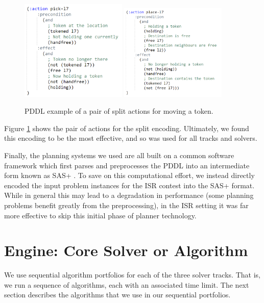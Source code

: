 \documentclass{article}
\renewcommand{\cite}[1]{\citep{#1}}
\begin{document}
\begin{figure}[htbp]
  \centering
  \includegraphics[width=0.45\textwidth]{figures/move-split-pick}
  \hfill
  \includegraphics[width=0.45\textwidth]{figures/move-split-place}
  \caption{PDDL example of a pair of split actions for moving a token.}
  \label{fig:move-split}
\end{figure}

Figure \ref{fig:move-split} shows the pair of actions for the split encoding. Ultimately, we found this encoding to be the most effective, and so was used for all tracks and solvers.

Finally, the planning systems we used are all built on a common software framework which first parses and preprocesses the PDDL into an intermediate form known as SAS+ \cite{backstrom-nebel-compint1995}. To save on this computational effort, we instead directly encoded the input problem instances for the ISR contest into the SAS+ format. While in general this may lead to a degradation in performance (some planning problems benefit greatly from the preprocessing), in the ISR setting it was far more effective to skip this initial phase of planner technology.

\section{Engine: Core Solver or Algorithm}


We use sequential algorithm portfolios for each of the three solver tracks. That
is, we run a sequence of algorithms, each with an associated time limit. The
next section describes the algorithms that we use in our sequential portfolios.
\end{document}
